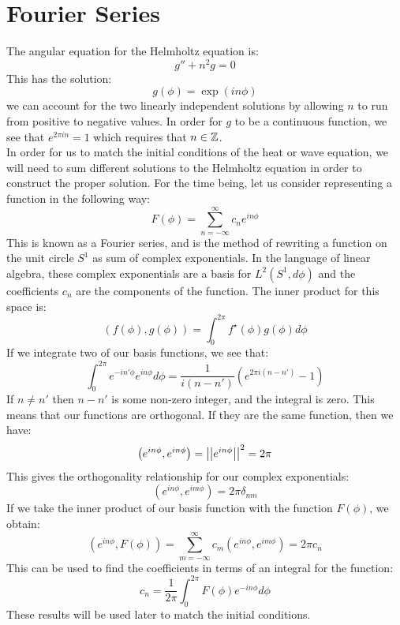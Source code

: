 \documentclass{article}
\begin{document}
\section{Fourier Series}
The angular equation for the Helmholtz equation is:
\begin{equation}
  g''+n^2 g=0
\end{equation}
This has the solution:
\begin{equation}
  g(\phi) = \exp(i n \phi)
\end{equation}
we can account for the two linearly independent solutions by allowing $n$ to run from positive to negative values. In order for $g$ to be a continuous function, we see that $e^{2\pi i n} = 1$ which requires that $n\in\mathbb{Z}$.\\
In order for us to match the initial conditions of the heat or wave equation, we will need to sum different solutions to the Helmholtz equation in order to construct the proper solution. For the time being, let us consider representing a function in the following way:
\begin{equation}
  F(\phi) = \sum_{n = -\infty}^\infty c_n e^{in\phi}
\end{equation}
This is known as a Fourier series, and is the method of rewriting a function on the unit circle $S^1$ as sum of complex exponentials. In the language of linear algebra, these complex exponentials are a basis for $L^2(S^1,d\phi)$ and the coefficients $c_n$ are the components of the function. The inner product for this space is:
\begin{equation}
  (f(\phi),g(\phi)) = \int_0^{2\pi} f^\star(\phi)g(\phi) d\phi
\end{equation}
If we integrate two of our basis functions, we see that:
\begin{equation}
  \int_0^{2\pi} e^{-i n' \phi} e^{i n \phi} d\phi = \frac{1}{i(n-n')}\left(e^{2\pi i (n-n')} - 1\right)
\end{equation}
If $n\neq n'$ then $n-n'$ is some non-zero integer, and the integral is zero. This means that our functions are orthogonal. If they are the same function, then we have:
\begin{equation}
  \left(e^{in\phi}, e^{i n\phi} \right) = \left|\left| e^{in\phi} \right|\right|^2 = 2\pi
\end{equation}
This gives the orthogonality relationship for our complex exponentials:
\begin{equation}
  \boxed{
  \left(e^{in\phi}, e^{i m\phi} \right) = 2\pi \delta_{nm}
  }
\end{equation}
If we take the inner product of our basis function with the function $F(\phi)$, we obtain:
\begin{equation}
  \left(e^{i n \phi},F(\phi)\right) = \sum_{m = -\infty}^\infty c_m \left(e^{in\phi}, e^{i m\phi} \right) = 2\pi c_n
\end{equation}
This can be used to find the coefficients in terms of an integral for the function:
\begin{equation}
  \boxed{
    c_n = \frac{1}{2\pi}\int_0^{2\pi} F(\phi) e^{-in\phi} d\phi
  }
\end{equation}
These results will be used later to match the initial conditions.
\end{document}
